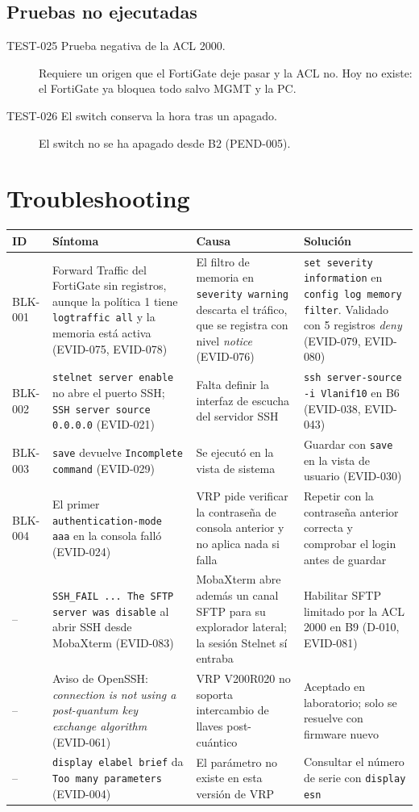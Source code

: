 \documentclass[11pt,a4paper]{article}
\newcommand{\cab}{\rowcolor{light}}
\begin{document}
\subsection{Pruebas no ejecutadas}
\begin{description}
  \item[TEST-025 Prueba negativa de la ACL 2000.] Requiere un origen que el FortiGate deje pasar y la ACL no. Hoy no existe: el FortiGate ya bloquea todo salvo MGMT y la PC.
  \item[TEST-026 El switch conserva la hora tras un apagado.] El switch no se ha apagado desde B2 (PEND-005).
\end{description}

\newpage
\section{Troubleshooting}
{\small
\begin{longtable}{L{1.5cm} L{3.8cm} L{4.4cm} L{5.0cm}}
  \toprule
  \cab\textbf{ID} & \textbf{Síntoma} & \textbf{Causa} & \textbf{Solución}\\
  \midrule
  \endhead
  BLK-001 & Forward Traffic del FortiGate sin registros, aunque la política 1 tiene \texttt{logtraffic all} y la memoria está activa (EVID-075, EVID-078) & El filtro de memoria en \texttt{severity warning} descarta el tráfico, que se registra con nivel \emph{notice} (EVID-076) & \texttt{set severity information} en \texttt{config log memory filter}. Validado con 5 registros \emph{deny} (EVID-079, EVID-080)\\
  BLK-002 & \texttt{stelnet server enable} no abre el puerto SSH; \texttt{SSH server source 0.0.0.0} (EVID-021) & Falta definir la interfaz de escucha del servidor SSH & \texttt{ssh server-source -i Vlanif10} en B6 (EVID-038, EVID-043)\\
  BLK-003 & \texttt{save} devuelve \texttt{Incomplete command} (EVID-029) & Se ejecutó en la vista de sistema & Guardar con \texttt{save} en la vista de usuario (EVID-030)\\
  BLK-004 & El primer \texttt{authentication-mode aaa} en la consola falló (EVID-024) & VRP pide verificar la contraseña de consola anterior y no aplica nada si falla & Repetir con la contraseña anterior correcta y comprobar el login antes de guardar\\
  -- & \texttt{SSH\_FAIL ... The SFTP server was disable} al abrir SSH desde MobaXterm (EVID-083) & MobaXterm abre además un canal SFTP para su explorador lateral; la sesión Stelnet sí entraba & Habilitar SFTP limitado por la ACL 2000 en B9 (D-010, EVID-081)\\
  -- & Aviso de OpenSSH: \emph{connection is not using a post-quantum key exchange algorithm} (EVID-061) & VRP V200R020 no soporta intercambio de llaves post-cuántico & Aceptado en laboratorio; solo se resuelve con firmware nuevo\\
  -- & \texttt{display elabel brief} da \texttt{Too many parameters} (EVID-004) & El parámetro no existe en esta versión de VRP & Consultar el número de serie con \texttt{display esn}\\
  \bottomrule
\end{longtable}
}
\end{document}
